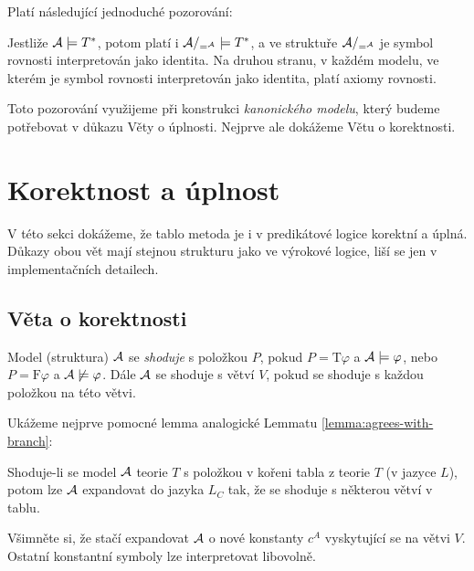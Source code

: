 Platí následující jednoduché pozorování:
\begin{observation}
    Jestliže $\mathcal{A}\models T^*$, potom platí i $\mathcal{A}/_{=^{\mathcal{A}}}\models T^*$, a ve struktuře $\mathcal{A}/_{=^{\mathcal{A}}}$ je symbol rovnosti interpretován jako identita. Na druhou stranu, v každém modelu, ve kterém je symbol rovnosti interpretován jako identita, platí axiomy rovnosti.
\end{observation}

Toto pozorování využijeme při konstrukci \emph{kanonického modelu}, který budeme potřebovat v důkazu Věty o úplnosti. Nejprve ale dokážeme Větu o korektnosti.

\section{Korektnost a úplnost}

V této sekci dokážeme, že tablo metoda je i v predikátové logice korektní a úplná. Důkazy obou vět mají stejnou strukturu jako ve výrokové logice, liší se jen v implementačních detailech.

\subsection{Věta o korektnosti}

Model (struktura) $\mathcal{A}$ se \emph{shoduje} s položkou $P$, pokud
$P=\mathrm{T}\varphi$ a $\mathcal{A}\models\varphi$, nebo $P=\mathrm{F}\varphi$ a $\mathcal{A}\not\models\varphi$. Dále $\mathcal{A}$ se shoduje s větví $V$, pokud se shoduje s každou položkou na této větvi.

Ukážeme nejprve pomocné lemma analogické Lemmatu \ref{lemma:agrees-with-branch}:
\begin{lemma}\label{lemma:agrees-with-branch}
    Shoduje-li se model $\mathcal{A}$ teorie $T$ s položkou v kořeni tabla z teorie $T$ (v jazyce $L$), potom lze $\mathcal{A}$ expandovat do jazyka $L_C$ tak, že se shoduje s některou větví v tablu.
\end{lemma}
Všimněte si, že stačí expandovat $\mathcal{A}$ o nové konstanty $c^A$ vyskytující se na větvi $V$. Ostatní konstantní symboly lze interpretovat libovolně.

